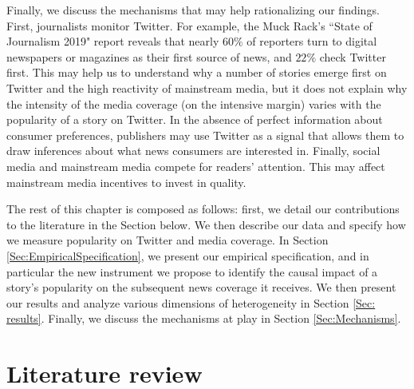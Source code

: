 Finally, we discuss the mechanisms that may help rationalizing our findings. First, journalists monitor Twitter. For example, the Muck Rack’s  ``State of Journalism 2019" report reveals that nearly $60\%$ of reporters turn to digital newspapers or magazines as their first source of news, and $22\%$ check Twitter first. This may help us to understand why a number of stories emerge first on Twitter and the high reactivity of mainstream media, but it does not explain why the intensity of the media coverage (on the intensive margin) varies with the popularity of a story on Twitter. In the absence of perfect information about consumer preferences, publishers may use Twitter as a signal that allows them to draw inferences about what news consumers are interested in. Finally, social media and mainstream media compete for readers' attention. This may affect mainstream media incentives to invest in quality.

\medskip
The rest of this chapter is composed as follows: first, we detail our contributions to the literature in the Section below.  We then describe our data and specify how we measure popularity on Twitter and media coverage. In Section \ref{Sec:EmpiricalSpecification}, we present our empirical specification, and in particular the new instrument we propose to identify the causal impact of a story's popularity on the subsequent news coverage it receives. We then present our results and analyze various dimensions of heterogeneity in Section \ref{Sec: results}. Finally, we discuss the mechanisms at play in Section \ref{Sec:Mechanisms}.

\section{Literature review}

